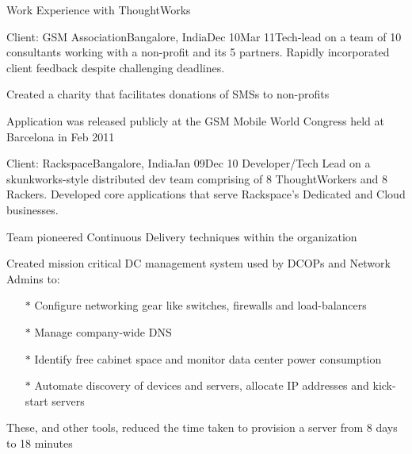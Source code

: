 \documentclass{resume} %
\begin{document}
\begin{rSection}{Work Experience with ThoughtWorks}
\begin{rSubsection}{Client: GSM Association}{Bangalore, India}{Dec 10}{Mar 11}{Tech-lead on a team of 10 consultants working with a non-profit
  and its 5 partners. Rapidly incorporated client feedback despite
  challenging deadlines.}
\item Created a charity that facilitates donations of SMSs to non-profits
\item Application was released publicly at the GSM Mobile World Congress held at Barcelona in Feb 2011
\end{rSubsection}



\begin{rSubsection}{Client: Rackspace}{Bangalore, India}{Jan 09}{Dec
    10}
{Developer/Tech Lead on a skunkworks-style distributed dev team comprising of 8
  ThoughtWorkers and 8 Rackers. Developed core applications that
serve Rackspace's Dedicated and Cloud businesses.}

\item Team pioneered Continuous Delivery techniques within the organization
\item Created mission critical DC management system used by
  DCOPs and Network Admins to:
\vspace{-0.5em}
\begin{itemize}  \itemsep0.5pt \parskip0pt
    \item[$\ast$] Configure networking gear like switches, firewalls and load-balancers
    \item[$\ast$] Manage company-wide DNS
    \item[$\ast$] Identify free cabinet space and monitor data center power consumption
    \item[$\ast$] Automate discovery of devices and servers, allocate IP addresses and kick-start servers
\end{itemize}
\item These, and other tools, reduced the time taken to provision a server from 8 days to 18 minutes
\end{rSubsection}

\end{rSection}

\end{document}
